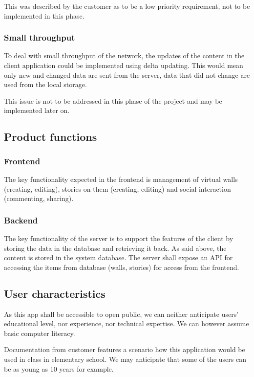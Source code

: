 \documentclass[11pt]{book}
\begin{document}
This was described by the customer as to be a low priority requirement, not to be implemented in this phase.

\subsubsection{Small throughput}
To deal with small throughput of the network, the updates of the content in the client application could be implemented using delta updating. This would mean only new and changed data are sent from the server, data that did not change are used from the local storage.

This issue is not to be addressed in this phase of the project and may be implemented later on.

\subsection{Product functions}

\subsubsection{Frontend}
The key functionality expected in the frontend is management of virtual walls (creating, editing), stories on them (creating, editing) and social interaction (commenting, sharing).

\subsubsection{Backend}
The key functionality of the server is to support the features of the client by storing the data in the database and retrieving it back. As said above, the content is stored in the system database. The server shall expose an API for accessing the items from database (walls, stories) for access from the frontend.

\subsection{User characteristics} \label{sec:req_user_characteristics}
As this app shall be accessible to open public, we can neither anticipate users' educational level, nor experience, nor technical expertise. We can however assume basic computer literacy.

Documentation from customer features a scenario how this application would be used in class in elementary school. We may anticipate that some of the users can be as young as 10 years for example.
\end{document}

